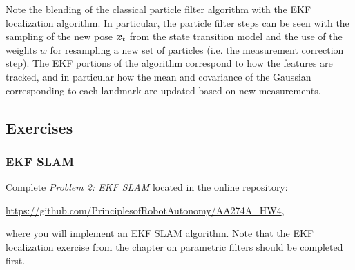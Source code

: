 Note the blending of the classical particle filter algorithm with the EKF localization algorithm. In particular, the particle filter steps can be seen with the sampling of the new pose $\bm{x}_t$ from the state transition model and the use of the weights $w$ for resampling a new set of particles (i.e. the measurement correction step). The EKF portions of the algorithm correspond to how the features are tracked, and in particular how the mean and covariance of the Gaussian corresponding to each landmark are updated based on new measurements.

\subsection{Exercises}
\subsubsection{EKF SLAM}
Complete \textit{Problem 2: EKF SLAM} located in the online repository:

\vspace{\baselineskip}

\url{https://github.com/PrinciplesofRobotAutonomy/AA274A_HW4},

\vspace{\baselineskip}

where you will implement an EKF SLAM algorithm. Note that the EKF localization exercise from the chapter on parametric filters should be completed first.

